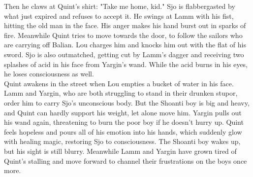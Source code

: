 Then he claws at Quint's shirt: "Take me home, kid." Sjo is flabbergasted by what just expired and refuses to accept it. He swings at Lamm with his fist, hitting the old man in the face. His anger makes his hand burst out in sparks of fire. Meanwhile Quint tries to move towards the door, to follow the sailors who are carrying off Balian. Lou charges him and knocks him out with the flat of his sword. Sjo is also outmatched, getting cut by Lamm's dagger and receiving two splashes of acid in his face from Yargin's wand. While the acid burns in his eyes, he loses consciousness as well.\\

Quint awakens in the street when Lou empties a bucket of water in his face. Lamm and Yargin, who are both struggling to stand in their drunken stupor, order him to carry Sjo's unconscious body. But the Shoanti boy is big and heavy, and Quint can hardly support his weight, let alone move him. Yargin pulls out his wand again, threatening to burn the poor boy if he doesn't hurry up. Quint feels hopeless and pours all of his emotion into his hands, which suddenly glow with healing magic, restoring Sjo to consciousness. The Shoanti boy wakes up, but his sight is still blurry. Meanwhile Lamm and Yargin have grown tired of Quint's stalling and move forward to channel their frustrations on the boys once more.\\

